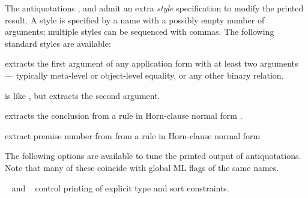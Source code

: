 \begin{isabellebody}
\begin{isamarkuptext}
\begin{description}
  \end{description}%
\end{isamarkuptext}%
\isamarkuptrue%
%
\isamarkuptrue%
%
\begin{isamarkuptext}%
The antiquotations ,  and  admit an extra \emph{style} specification to modify the
  printed result.  A style is specified by a name with a possibly
  empty number of arguments;  multiple styles can be sequenced with
  commas.  The following standard styles are available:

  \begin{description}
  
  \item {} extracts the first argument of any application
  form with at least two arguments --- typically meta-level or
  object-level equality, or any other binary relation.
  
  \item {} is like , but extracts the second
  argument.
  
  \item {} extracts the conclusion  from a rule
  in Horn-clause normal form .
  
  \item {}  extract premise number
   from from a rule in Horn-clause
  normal form 

  \end{description}%
\end{isamarkuptext}%
\isamarkuptrue%
%
\isamarkuptrue%
%
\begin{isamarkuptext}%
The following options are available to tune the printed output
  of antiquotations.  Note that many of these coincide with global ML
  flags of the same names.

  \begin{description}

  \item {}\hypertarget{antiquotation option.show-types}{\hyperlink{antiquotation option.show-types}{\mbox{}}}~ and
  \hypertarget{antiquotation option.show-sorts}{\hyperlink{antiquotation option.show-sorts}{\mbox{}}}~ control
  printing of explicit type and sort constraints.


\end{description}
\end{isamarkuptext}
\end{isabellebody}
